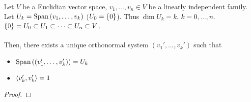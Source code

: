 \documentclass[letterpaper,12pt]{article}
\begin{document}
\begin{theorem}
Let $V$ be a Euclidian vector space, $v_1, \dots, v_n \in V$ be a linearly independent family. Let $U_k = \text{Span}\left(v_1, \dots, v_k \right)$ ($U_0 = \left\{ 0 \right\}$). Thus $\dim{U_k} = k$. $k = 0, \dots, n$. $\left\{ 0 \right\} = U_0 \subset U_1 \subset \dots \subset U_n \subset V$.
\\ \\ Then, there exists a unique orthonormal system $(v_1', \dots, v_k')$ such that
\begin{itemize}
    \item $\text{Span}\left((v'_1, \dots, v'_k) \right) = U_k$
    \item $\left< v_k', v_k' \right> = 1$
\end{itemize}
\end{theorem}
\begin{proof}


\end{proof}
\end{document}
